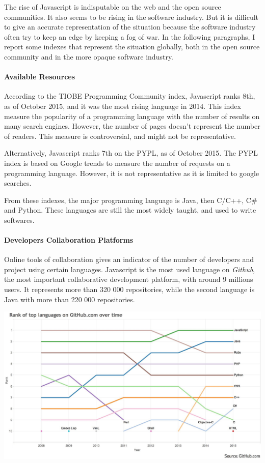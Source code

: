 The rise of Javascript is indisputable on the web and the open source communities.
It also seems to be rising in the software industry.
But it is difficult to give an accurate representation of the situation because the software industry often try to keep an edge by keeping a fog of war.
In the following paragraphs, I report some indexes that represent the situation globally, both in the open source community and in the more opaque software industry.

\paragraph{Available Resources}

According to the TIOBE Programming Community index, Javascript ranks 8th, as of October 2015, and it was the most rising language in 2014.
This index measure the popularity of a programming language with the number of results on many search engines.
However, the number of pages doesn't represent the number of readers.
This measure is controversial, and might not be representative.

Alternatively, Javascript ranks 7th on the PYPL, as of October 2015.
The PYPL index is based on Google trends to measure the number of requests on a programming language.
However, it is not representative as it is limited to google searches.

From these indexes, the major programming language is Java, then C/C++, C\# and Python.
These languages are still the most widely taught, and used to write softwares.


\paragraph{Developers Collaboration Platforms}

Online tools of collaboration gives an indicator of the number of developers and project using certain languages.
Javascript is the most used language on \textit{Github}, the most important collaborative development platform, with around 9 millions users.
It represents more than 320 000 repositories, while the second language is Java with more than 220 000 repositories.

\includegraphics[width=0.9\linewidth]{../../data/js-trends/github-ranks}


